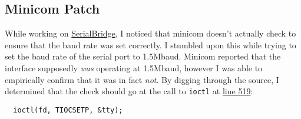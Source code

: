 \documentclass[format.tex]{subfiles}
\begin{document}
\subsection*{Minicom Patch}
While working on
\href{https://github.com/AmateurECE/SerialBridge}{SerialBridge}, I noticed that
minicom doesn't actually check to ensure that the baud rate was set correctly.
I stumbled upon this while trying to set the baud rate of the serial port to
1.5Mbaud. Minicom reported that the interface supposedly \textit{was} operating
at 1.5Mbaud, however I was able to empirically confirm that it was in fact
\textit{not}. By digging through the source, I determined that the check should
go at the call to \texttt{ioctl} at
\href{https://github.com/Distrotech/minicom/blob/54202fe0ea8510dc8fcd23ab49d39d
  3d8cb2e529/src/sysdep1.c#L519}{line 519}:
\begin{verbatim}
  ioctl(fd, TIOCSETP, &tty);
\end{verbatim}
\end{document}
